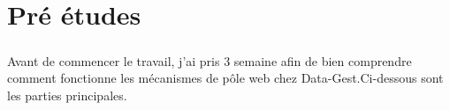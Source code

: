 \chapter{Pré études}\thispagestyle{fancy}
\paragraph{}
Avant de commencer le travail, j'ai pris 3 semaine afin de bien comprendre comment fonctionne les mécanismes de pôle web chez Data-Gest.Ci-dessous sont les parties principales.


%
